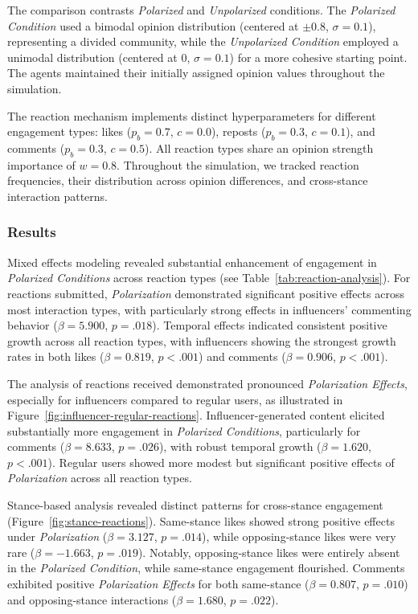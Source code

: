 The comparison contrasts \emph{Polarized} and \emph{Unpolarized} conditions. The \emph{Polarized Condition} used a bimodal opinion distribution (centered at $\pm0.8$, $\sigma = 0.1$), representing a divided community, while the \emph{Unpolarized Condition} employed a unimodal distribution (centered at $0$, $\sigma = 0.1$) for a more cohesive starting point. The agents maintained their initially assigned opinion values throughout the simulation.

The reaction mechanism implements distinct hyperparameters for different engagement types: likes ($p_b = 0.7$, $c = 0.0$), reposts ($p_b = 0.3$, $c = 0.1$), and comments ($p_b = 0.3$, $c = 0.5$). All reaction types share an opinion strength importance of $w = 0.8$. Throughout the simulation, we tracked reaction frequencies, their distribution across opinion differences, and cross-stance interaction patterns.

\subsubsection{Results}

Mixed effects modeling revealed substantial enhancement of engagement in \emph{Polarized Conditions} across reaction types (see Table~\ref{tab:reaction-analysis}). For reactions submitted, \emph{Polarization} demonstrated significant positive effects across most interaction types, with particularly strong effects in influencers' commenting behavior ($\beta = 5.900$, $p = .018$). Temporal effects indicated consistent positive growth across all reaction types, with influencers showing the strongest growth rates in both likes ($\beta = 0.819$, $p < .001$) and comments ($\beta = 0.906$, $p < .001$).



The analysis of reactions received demonstrated pronounced \emph{Polarization Effects}, especially for influencers compared to regular users, as illustrated in Figure~\ref{fig:influencer-regular-reactions}. Influencer-generated content elicited substantially more engagement in \emph{Polarized Conditions}, particularly for comments ($\beta = 8.633$, $p = .026$), with robust temporal growth ($\beta = 1.620$, $p < .001$). Regular users showed more modest but significant positive effects of \emph{Polarization} across all reaction types.



Stance-based analysis revealed distinct patterns for cross-stance engagement (Figure~\ref{fig:stance-reactions}). Same-stance likes showed strong positive effects under \emph{Polarization} ($\beta = 3.127$, $p = .014$), while opposing-stance likes were very rare ($\beta = -1.663$, $p = .019$). Notably, opposing-stance likes were entirely absent in the \emph{Polarized Condition}, while same-stance engagement flourished. Comments exhibited positive \emph{Polarization Effects} for both same-stance ($\beta = 0.807$, $p = .010$) and opposing-stance interactions ($\beta = 1.680$, $p = .022$).

